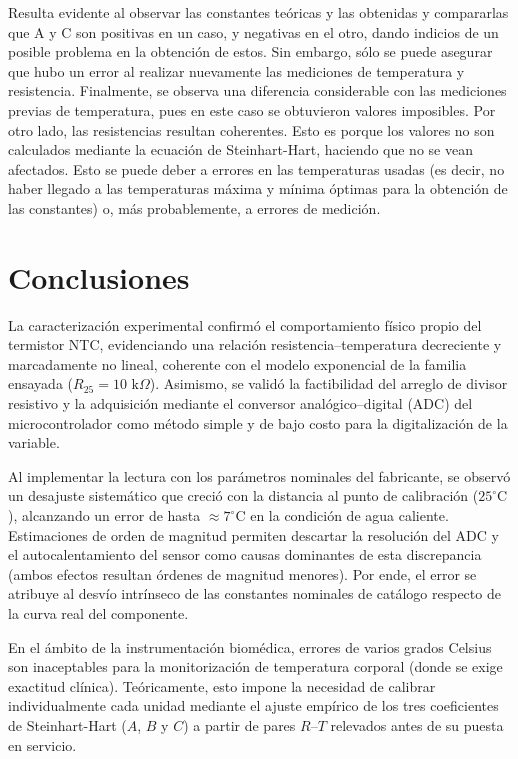 \documentclass[10pt]{article}
\begin{document}
Resulta evidente al observar las constantes teóricas y las obtenidas y compararlas que A y C son positivas en un caso, y negativas en el otro, dando indicios de un posible problema en la obtención de estos. Sin embargo, sólo se puede asegurar que hubo un error al realizar nuevamente las mediciones de temperatura y resistencia.
Finalmente, se observa una diferencia considerable con las mediciones previas de temperatura, pues en este caso se obtuvieron valores imposibles. Por otro lado, las resistencias resultan coherentes. Esto es porque los valores no son calculados mediante la ecuación de Steinhart-Hart, haciendo que no se vean afectados.
Esto se puede deber a errores en las temperaturas usadas (es decir, no haber llegado a las temperaturas máxima y mínima óptimas para la obtención de las constantes) o, más probablemente, a errores de medición.

\section{Conclusiones}

La caracterización experimental confirmó el comportamiento físico propio del termistor NTC, evidenciando una relación resistencia--temperatura decreciente y marcadamente no lineal, coherente con el modelo exponencial de la familia ensayada ($R_{25} = 10\text{ k}\Omega$). Asimismo, se validó la factibilidad del arreglo de divisor resistivo y la adquisición mediante el conversor analógico--digital (ADC) del microcontrolador como método simple y de bajo costo para la digitalización de la variable.

\vspace{0.3cm}

Al implementar la lectura con los parámetros nominales del fabricante, se observó un desajuste sistemático que creció con la distancia al punto de calibración ($25^\circ\text{C}$), alcanzando un error de hasta $\approx 7^\circ\text{C}$ en la condición de agua caliente. Estimaciones de orden de magnitud permiten descartar la resolución del ADC y el autocalentamiento del sensor como causas dominantes de esta discrepancia (ambos efectos resultan órdenes de magnitud menores). Por ende, el error se atribuye al desvío intrínseco de las constantes nominales de catálogo respecto de la curva real del componente.

\vspace{0.3cm}

En el ámbito de la instrumentación biomédica, errores de varios grados Celsius son inaceptables para la monitorización de temperatura corporal (donde se exige exactitud clínica). Teóricamente, esto impone la necesidad de calibrar individualmente cada unidad mediante el ajuste empírico de los tres coeficientes de Steinhart-Hart ($A$, $B$ y $C$) a partir de pares $R$--$T$ relevados antes de su puesta en servicio.
\end{document}
